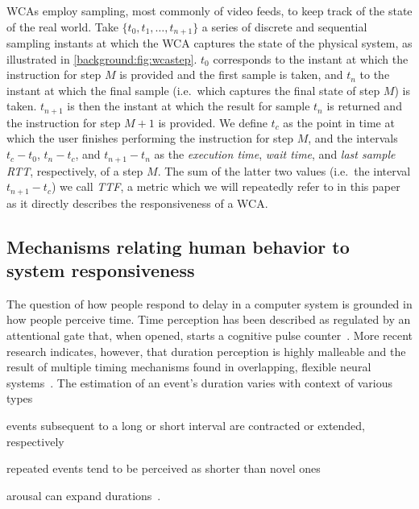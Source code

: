 \glspl{WCA} employ sampling, most commonly of video feeds, to keep track of the state of the real world.
Take \( \{ t_0, t_1, \ldots, t_{n + 1} \} \) a series of discrete and sequential sampling instants at which the \gls{WCA} captures the state of the physical system, as illustrated in \cref{background:fig:wcastep}.
\( t_0 \) corresponds to the instant at which the instruction for step \( M \) is provided and the first sample is taken, and \( t_n \) to the instant at which the final sample (i.e.\ which captures the final state of step \( M \)) is taken.
\( t_{n + 1} \) is then the instant at which the result for sample \( t_n \) is returned and the instruction for step \( M + 1 \) is provided.
We define \( t_c \) as the point in time at which the user finishes performing the instruction for step \( M \), and the intervals \( t_c - t_0 \), \( t_n - t_c \), and \( t_{n + 1} - t_n \) as the \emph{execution time}, \emph{wait time}, and \emph{last sample \gls{RTT}}, respectively, of a step \( M \).
The sum of the latter two values (i.e.\ the interval \( t_{n + 1} - t_c \)) we call \emph{\gls{TTF}}, a metric which we will repeatedly refer to in this paper as it directly describes the responsiveness of a \gls{WCA}.

\subsection{Mechanisms relating human behavior to system responsiveness}

The question of how people respond to delay in a computer system is grounded in how people perceive time.
Time perception has been described as regulated by an attentional gate that, when opened, starts a cognitive pulse counter~\cite{zakay1995attentional,zakay1996role}.
More recent research indicates, however, that duration perception is highly malleable and the result of multiple timing mechanisms found in overlapping, flexible neural systems~\cite{bruno2016multiple,wiener2011multiple}.
The estimation of an event's duration varies with context of various types
\begin{enumerate*}[label={(\roman*)}, before=\unskip{: }, itemjoin={{; }}, itemjoin*={{; and }}]
\item events subsequent to a long or short interval are contracted or extended, respectively~\cite{heron2012duration}
\item repeated events tend to be perceived as shorter than novel ones~\cite{matthews2011stimulus}
\item arousal can expand durations~\cite{droit_volet2011emotion}.
\end{enumerate*}

